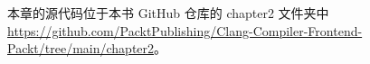 
本章的源代码位于本书 GitHub 仓库的 chapter2 文件夹中 \url{https://github.com/PacktPublishing/Clang-Compiler-Frontend-Packt/tree/main/chapter2}。
